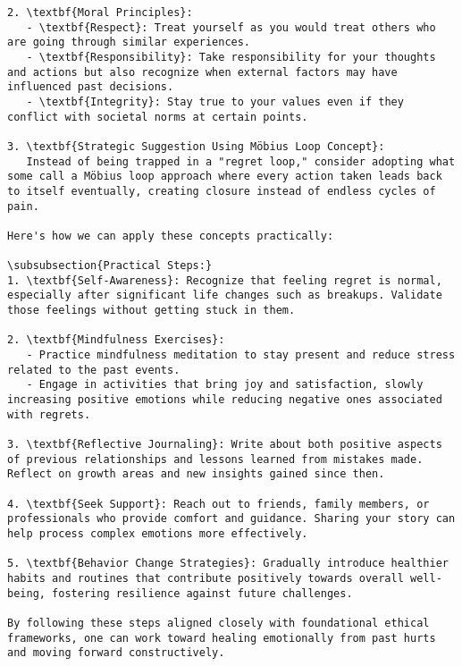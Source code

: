 \documentclass[11pt,a4paper]{article}
\begin{document}
\begin{verbatim}
2. \textbf{Moral Principles}:
   - \textbf{Respect}: Treat yourself as you would treat others who are going through similar experiences.
   - \textbf{Responsibility}: Take responsibility for your thoughts and actions but also recognize when external factors may have influenced past decisions.
   - \textbf{Integrity}: Stay true to your values even if they conflict with societal norms at certain points.

3. \textbf{Strategic Suggestion Using Möbius Loop Concept}:
   Instead of being trapped in a "regret loop," consider adopting what some call a Möbius loop approach where every action taken leads back to itself eventually, creating closure instead of endless cycles of pain.

Here's how we can apply these concepts practically:

\subsubsection{Practical Steps:}
1. \textbf{Self-Awareness}: Recognize that feeling regret is normal, especially after significant life changes such as breakups. Validate those feelings without getting stuck in them.
  
2. \textbf{Mindfulness Exercises}:
   - Practice mindfulness meditation to stay present and reduce stress related to the past events.
   - Engage in activities that bring joy and satisfaction, slowly increasing positive emotions while reducing negative ones associated with regrets.

3. \textbf{Reflective Journaling}: Write about both positive aspects of previous relationships and lessons learned from mistakes made. Reflect on growth areas and new insights gained since then.

4. \textbf{Seek Support}: Reach out to friends, family members, or professionals who provide comfort and guidance. Sharing your story can help process complex emotions more effectively.

5. \textbf{Behavior Change Strategies}: Gradually introduce healthier habits and routines that contribute positively towards overall well-being, fostering resilience against future challenges.

By following these steps aligned closely with foundational ethical frameworks, one can work toward healing emotionally from past hurts and moving forward constructively.
\end{verbatim}
\end{document}
